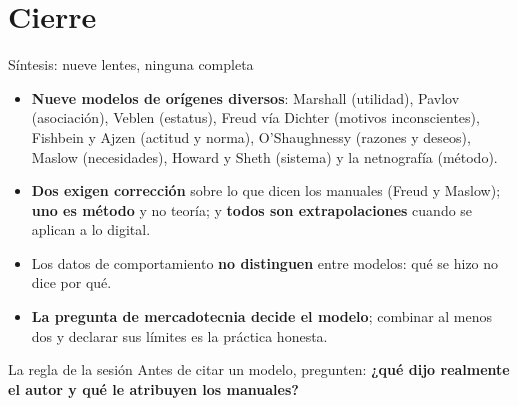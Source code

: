 \documentclass[aspectratio=169,xcolor=dvipsnames]{beamer}
\begin{document}
\section{Cierre}

\begin{frame}{Síntesis: nueve lentes, ninguna completa}
\begin{itemize}
  \footnotesize
  \item \textbf{Nueve modelos de orígenes diversos}: Marshall (utilidad), Pavlov (asociación), Veblen (estatus), Freud vía Dichter (motivos inconscientes), Fishbein y Ajzen (actitud y norma), O'Shaughnessy (razones y deseos), Maslow (necesidades), Howard y Sheth (sistema) y la netnografía (método).
  \item \textbf{Dos exigen corrección} sobre lo que dicen los manuales (Freud y Maslow); \textbf{uno es método} y no teoría; y \textbf{todos son extrapolaciones} cuando se aplican a lo digital.
  \item Los datos de comportamiento \textbf{no distinguen} entre modelos: qué se hizo no dice por qué.
  \item \textbf{La pregunta de mercadotecnia decide el modelo}; combinar al menos dos y declarar sus límites es la práctica honesta.
\end{itemize}
\vspace{2pt}
\begin{alertblock}{La regla de la sesión}
  \small Antes de citar un modelo, pregunten: \textbf{¿qué dijo realmente el autor y qué le atribuyen los manuales?}
\end{alertblock}
\end{frame}
\end{document}
